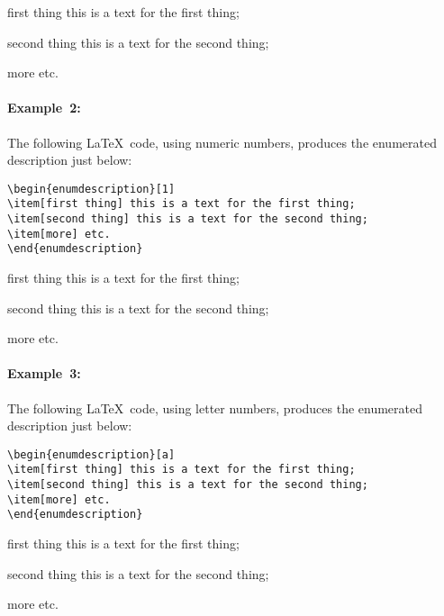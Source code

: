\documentclass[book]{upmethodology-document}
\begin{document}
\begin{enumdescription}
\item[first thing] this is a text for the first thing;
\item[second thing] this is a text for the second thing;
\item[more] etc.
\end{enumdescription}

\paragraph{Example~2:} The following \LaTeX~code, using numeric numbers, produces the enumerated description just below:
\begin{verbatim}
\begin{enumdescription}[1]
\item[first thing] this is a text for the first thing;
\item[second thing] this is a text for the second thing;
\item[more] etc.
\end{enumdescription}
\end{verbatim}

\begin{enumdescription}[1]
\item[first thing] this is a text for the first thing;
\item[second thing] this is a text for the second thing;
\item[more] etc.
\end{enumdescription}

\paragraph{Example~3:} The following \LaTeX~code, using letter numbers, produces the enumerated description just below:
\begin{verbatim}
\begin{enumdescription}[a]
\item[first thing] this is a text for the first thing;
\item[second thing] this is a text for the second thing;
\item[more] etc.
\end{enumdescription}
\end{verbatim}

\begin{enumdescription}[a]
\item[first thing] this is a text for the first thing;
\item[second thing] this is a text for the second thing;
\item[more] etc.
\end{enumdescription}
\end{document}
